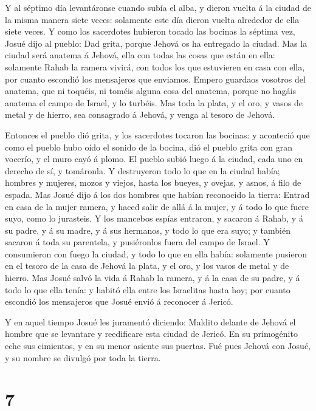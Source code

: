  Y al séptimo día levantáronse cuando subía el alba, y
dieron vuelta á la ciudad de la misma manera siete veces: solamente este
día dieron vuelta alrededor de ella siete veces.  Y como
los sacerdotes hubieron tocado las bocinas la séptima vez, Josué dijo al
pueblo: Dad grita, porque Jehová os ha entregado la ciudad.
 Mas la ciudad será anatema á Jehová, ella con todas las
cosas que están en ella: solamente Rahab la ramera vivirá, con todos los
que estuvieren en casa con ella, por cuanto escondió los mensajeros que
enviamos.  Empero guardaos vosotros del anatema, que ni
toquéis, ni toméis alguna cosa del anatema, porque no hagáis anatema el
campo de Israel, y lo turbéis.  Mas toda la plata, y el
oro, y vasos de metal y de hierro, sea consagrado á Jehová, y venga al
tesoro de Jehová.

 Entonces el pueblo dió grita, y los sacerdotes tocaron las
bocinas: y aconteció que como el pueblo hubo oído el sonido de la
bocina, dió el pueblo grita con gran vocerío, y el muro cayó á plomo. El
pueblo subió luego á la ciudad, cada uno en derecho de sí, y tomáronla.
 Y destruyeron todo lo que en la ciudad había; hombres y
mujeres, mozos y viejos, hasta los bueyes, y ovejas, y asnos, á filo de
espada.  Mas Josué dijo á los dos hombres que habían
reconocido la tierra: Entrad en casa de la mujer ramera, y haced salir
de allá á la mujer, y á todo lo que fuere suyo, como lo jurasteis.
 Y los mancebos espías entraron, y sacaron á Rahab, y á su
padre, y á su madre, y á sus hermanos, y todo lo que era suyo; y también
sacaron á toda su parentela, y pusiéronlos fuera del campo de Israel.
 Y consumieron con fuego la ciudad, y todo lo que en ella
había: solamente pusieron en el tesoro de la casa de Jehová la plata, y
el oro, y los vasos de metal y de hierro.  Mas Josué salvó
la vida á Rahab la ramera, y á la casa de su padre, y á todo lo que ella
tenía: y habitó ella entre los Israelitas hasta hoy; por cuanto escondió
los mensajeros que Josué envió á reconocer á Jericó.

 Y en aquel tiempo Josué les juramentó diciendo: Maldito
delante de Jehová el hombre que se levantare y reedificare esta ciudad
de Jericó. En su primogénito eche sus cimientos, y en su menor asiente
sus puertas.  Fué pues Jehová con Josué, y su nombre se
divulgó por toda la tierra.

\hypertarget{section-6}{%
\section{7}\label{section-6}}

